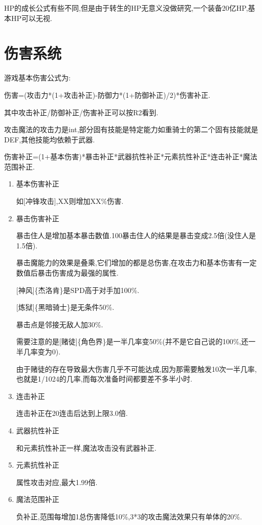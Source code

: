 	HP的成长公式有些不同,但是由于转生的HP无意义没做研究,一个装备20亿HP,基本HP可以无视.

	\newpage

	\section{伤害系统}
	
	游戏基本伤害公式为:

	伤害=(攻击力*(1+攻击补正)-防御力*(1+防御补正)/2)*伤害补正.

	其中攻击补正/防御补正/伤害补正可以按R2看到.

	攻击魔法的攻击力是int,部分固有技能是特定能力如重骑士的第二个固有技能就是DEF,其他技能均依赖于武器.

	伤害补正=(1+基本伤害)*暴击补正*武器抗性补正*元素抗性补正*连击补正*魔法范围补正.

	\begin{enumerate}

		\item 基本伤害补正

		如[冲锋攻击],XX则增加XX\%伤害.

		\item 暴击伤害补正

		暴击住人是增加基本暴击数值.100暴击住人的结果是暴击变成2.5倍(没住人是1.5倍).

		暴击魔能力的效果是叠乘,它们增加的都是总伤害,在攻击力和基本伤害有一定数值后暴击伤害成为最强的属性.

		[神风]\{杰洛肯\}是SPD高于对手加100\%.

		[炼狱]\{黑暗骑士\}是无条件50\%.

		暴击点是邻接无敌人加30\%.

		需要注意的是[赌徒]\{角色界\}是一半几率变50\%(并不是它自己说的100\%,还一半几率变为0).

		由于赌徒的存在导致最大伤害几乎不可能达成,因为那需要触发10次一半几率,也就是1/1024的几率,而每次准备时间都要差不多半小时.

		\item 连击补正
		
		连击补正在20连击后达到上限3.0倍.

		\item 武器抗性补正

		和元素抗性补正一样,魔法攻击没有武器补正.

		\item 元素抗性补正
		
		属性攻击对应,最大1.99倍.

		\item 魔法范围补正
		
		负补正,范围每增加1总伤害降低10\%,3*3的攻击魔法效果只有单体的20\%.

	\end{enumerate}

